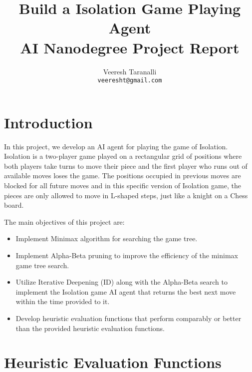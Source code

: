 \documentclass{article} %
\title{Build a Isolation Game Playing Agent\\
       AI Nanodegree Project Report}
\author{Veeresh Taranalli \\
\texttt{veeresht@gmail.com}
}
\begin{document}
\maketitle


\section{Introduction}
\label{sec:intro}

In this project, we develop an AI agent for playing the game of Isolation. Isolation is a two-player game played on a rectangular grid of positions where both players take turns to move their piece and the first player who runs out of available moves loses the game. The positions occupied in previous moves are blocked for all future moves and in this specific version of Isolation game, the pieces are only allowed to move in L-shaped steps, just like a knight on a Chess board.

The main objectives of this project are:
\begin{itemize}
    \item Implement Minimax algorithm for searching the game tree.
    \item Implement Alpha-Beta pruning to improve the efficiency of the minimax game tree search.
    \item Utilize Iterative Deepening (ID) along with the Alpha-Beta search to implement the Isolation game AI agent that returns the best next move within the
    time provided to it.
    \item Develop heuristic evaluation functions that perform comparably or better than the provided heuristic evaluation functions.
\end{itemize}

\section{Heuristic Evaluation Functions}
\label{sec:heuristics}
\end{document}
